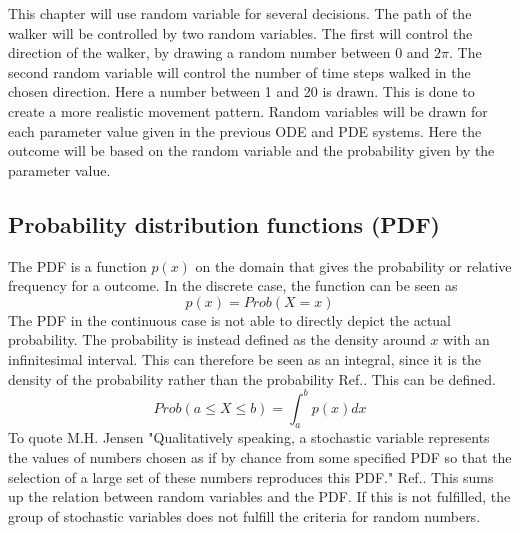 \documentclass[%
twoside,                 %
final,                   %
chapterprefix=true,      %
open=right               %
10pt]{book}
\begin{document}
\vspace{3mm}




\vspace{3mm}


This chapter will use random variable for several decisions. The path of the walker will be controlled by two random variables. The first will control the direction of the walker, by drawing a random number between $0$ and $2\pi$. The second random variable will control the number of time steps walked in the chosen direction. Here a number between 1 and 20 is drawn. This is done to create a more realistic movement pattern. Random variables will be drawn for each parameter value given in the previous ODE and PDE systems. Here the outcome will be based on the random variable and the probability given by the parameter value. 

\subsection{Probability distribution functions (PDF)}
The PDF is a function $p(x)$ on the domain that gives the probability or relative frequency for a outcome. In the discrete case, the function can be seen as
\begin{equation}
p(x) = Prob(X=x)
\end{equation}
The PDF in the continuous case is not able to directly depict the actual probability. The probability is instead defined as the density around $x$ with an infinitesimal interval. This can therefore be seen as an integral, since it is the density of the probability rather than the probability Ref.\cite{hjorth2011computational}. This can be defined.
\begin{equation}
 Prob(a\leq X \leq b) = \int^b_a p(x)dx
\end{equation}
To quote M.H. Jensen "Qualitatively speaking, a stochastic variable represents the values of numbers chosen as if by chance from some specified PDF so that the selection of a large set of these numbers reproduces this PDF." Ref.\cite{hjorth2011computational}. This sums up the relation between random variables and the PDF. If this is not fulfilled, the group of stochastic variables does not fulfill the criteria for random numbers. 


\vspace{3mm}




\vspace{3mm}
\end{document}
